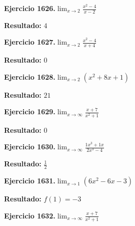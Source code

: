 \documentclass[10pt,a4paper]{article}
\begin{document}
\begin{ejbox}
\textbf{Ejercicio 1626.}\quad $\lim_{x\to 2} \frac{x^2-4}{x-2}$
\end{ejbox}

\begin{solbox}
\textbf{Resultado:} \(\displaystyle 4\)
\end{solbox}

\newpage
\begin{ejbox}
\textbf{Ejercicio 1627.}\quad $\lim_{x\to 2} \frac{x^2-4}{x+4}$
\end{ejbox}

\begin{solbox}
\textbf{Resultado:} \(\displaystyle 0\)
\end{solbox}

\begin{ejbox}
\textbf{Ejercicio 1628.}\quad $\lim_{x\to 2} (x^2 +8x +1)$
\end{ejbox}

\begin{solbox}
\textbf{Resultado:} \(\displaystyle 21\)
\end{solbox}

\begin{ejbox}
\textbf{Ejercicio 1629.}\quad $\lim_{x\to \infty} \frac{x + 7}{x^2 + 1}$
\end{ejbox}

\begin{solbox}
\textbf{Resultado:} \(\displaystyle 0\)
\end{solbox}

\newpage
\begin{ejbox}
\textbf{Ejercicio 1630.}\quad $\lim_{x\to \infty} \frac{1x^3 + 1x}{2x^3 - 4}$
\end{ejbox}

\begin{solbox}
\textbf{Resultado:} \(\displaystyle \frac{1}{2}\)
\end{solbox}

\begin{ejbox}
\textbf{Ejercicio 1631.}\quad $\lim_{x\to 1} (6x^2 -6x -3)$
\end{ejbox}

\begin{solbox}
\textbf{Resultado:} \(\displaystyle f(1) = -3\)
\end{solbox}

\begin{ejbox}
\textbf{Ejercicio 1632.}\quad $\lim_{x\to \infty} \frac{x + 7}{x^2 + 1}$
\end{ejbox}
\end{document}
